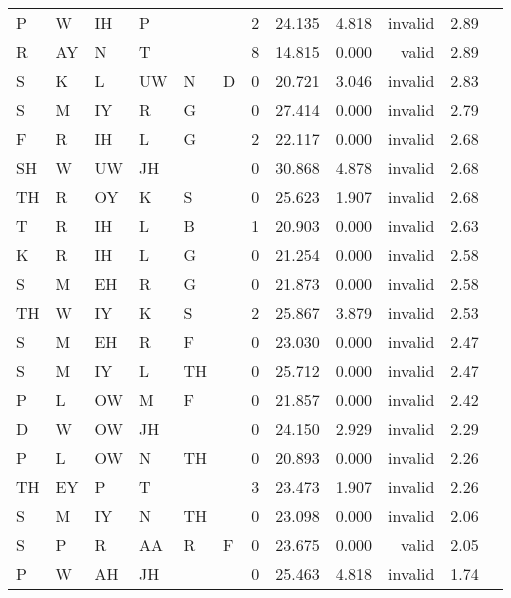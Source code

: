 \begin{longtable}{l@{ } l@{ } l@{ } l@{ } l@{ } l r r r r r r}
P  & W  & IH & P  &    &   &  2 & 24.135 & 4.818 & invalid & 2.89 \\
R  & AY & N  & T  &    &   &  8 & 14.815 & 0.000 & valid   & 2.89 \\
S  & K  & L  & UW & N  & D &  0 & 20.721 & 3.046 & invalid & 2.83 \\
S  & M  & IY & R  & G  &   &  0 & 27.414 & 0.000 & invalid & 2.79 \\
F  & R  & IH & L  & G  &   &  2 & 22.117 & 0.000 & invalid & 2.68 \\
SH & W  & UW & JH &    &   &  0 & 30.868 & 4.878 & invalid & 2.68 \\
TH & R  & OY & K  & S  &   &  0 & 25.623 & 1.907 & invalid & 2.68 \\
T  & R  & IH & L  & B  &   &  1 & 20.903 & 0.000 & invalid & 2.63 \\
K  & R  & IH & L  & G  &   &  0 & 21.254 & 0.000 & invalid & 2.58 \\
S  & M  & EH & R  & G  &   &  0 & 21.873 & 0.000 & invalid & 2.58 \\
TH & W  & IY & K  & S  &   &  2 & 25.867 & 3.879 & invalid & 2.53 \\
S  & M  & EH & R  & F  &   &  0 & 23.030 & 0.000 & invalid & 2.47 \\
S  & M  & IY & L  & TH &   &  0 & 25.712 & 0.000 & invalid & 2.47 \\
P  & L  & OW & M  & F  &   &  0 & 21.857 & 0.000 & invalid & 2.42 \\
D  & W  & OW & JH &    &   &  0 & 24.150 & 2.929 & invalid & 2.29 \\
P  & L  & OW & N  & TH &   &  0 & 20.893 & 0.000 & invalid & 2.26 \\
TH & EY & P  & T  &    &   &  3 & 23.473 & 1.907 & invalid & 2.26 \\
S  & M  & IY & N  & TH &   &  0 & 23.098 & 0.000 & invalid & 2.06 \\
S  & P  & R  & AA & R  & F &  0 & 23.675 & 0.000 & valid   & 2.05 \\
P  & W  & AH & JH &    &   &  0 & 25.463 & 4.818 & invalid & 1.74 \\
\bottomrule
\end{longtable}
